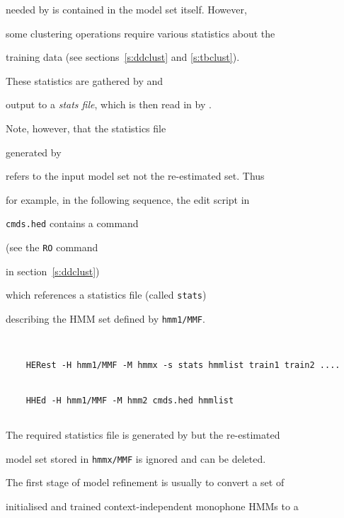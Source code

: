 needed by  is contained in the model set itself.  However,


some clustering operations require various statistics about the


training data (see sections~\ref{s:ddclust} and \ref{s:tbclust}).  


These statistics are gathered by  and 


output to a \textit{stats file}, which is then read in by .


Note, however, that the statistics file 


generated by 


refers to the input model set not the re-estimated set.  Thus


for example, in the following sequence, the  edit script in


\texttt{cmds.hed} contains a command 


(see the \texttt{RO} command 


in section~\ref{s:ddclust})


which references a statistics file  (called \texttt{stats}) 


describing the HMM set defined by \texttt{hmm1/MMF}.


\begin{verbatim}


    HERest -H hmm1/MMF -M hmmx -s stats hmmlist train1 train2 ....


    HHEd -H hmm1/MMF -M hmm2 cmds.hed hmmlist


\end{verbatim}


The required statistics file is generated by   but the re-estimated


model set stored in \texttt{hmmx/MMF} is  ignored and can be deleted.












The first stage of model refinement is usually to convert a set of


initialised and trained context-independent monophone HMMs to a 


